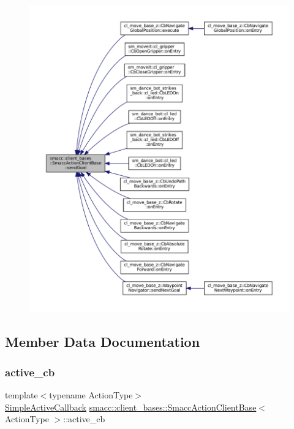 \begin{figure}[H]
\begin{center}
\leavevmode
\includegraphics[width=350pt]{classsmacc_1_1client__bases_1_1SmaccActionClientBase_a9c47a5094ac8afb01680307fe5eca922_icgraph}
\end{center}
\end{figure}


\subsection{Member Data Documentation}
\mbox{\label{classsmacc_1_1client__bases_1_1SmaccActionClientBase_a8aada706b9b8ca50792b48c2f990394a}} 
\subsubsection{\texorpdfstring{active\+\_\+cb}{active\_cb}}
{\footnotesize\ttfamily template$<$typename Action\+Type$>$ \\
\hyperlink{classsmacc_1_1client__bases_1_1SmaccActionClientBase_acfd06f7c33418c03a340e74b00a4dddc}{Simple\+Active\+Callback} \hyperlink{classsmacc_1_1client__bases_1_1SmaccActionClientBase}{smacc\+::client\+\_\+bases\+::\+Smacc\+Action\+Client\+Base}$<$ Action\+Type $>$\+::active\+\_\+cb}



